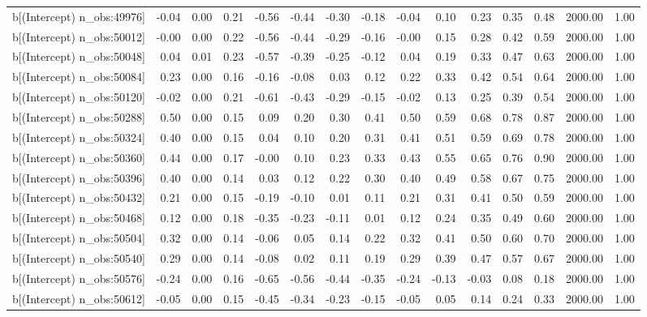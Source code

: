\begin{table}[ht]
\begin{tabular}{rrrrrrrrrrrrrrr}
  b[(Intercept) n\_obs:49976] & -0.04 & 0.00 & 0.21 & -0.56 & -0.44 & -0.30 & -0.18 & -0.04 & 0.10 & 0.23 & 0.35 & 0.48 & 2000.00 & 1.00 \\ 
  b[(Intercept) n\_obs:50012] & -0.00 & 0.00 & 0.22 & -0.56 & -0.44 & -0.29 & -0.16 & -0.00 & 0.15 & 0.28 & 0.42 & 0.59 & 2000.00 & 1.00 \\ 
  b[(Intercept) n\_obs:50048] & 0.04 & 0.01 & 0.23 & -0.57 & -0.39 & -0.25 & -0.12 & 0.04 & 0.19 & 0.33 & 0.47 & 0.63 & 2000.00 & 1.00 \\ 
  b[(Intercept) n\_obs:50084] & 0.23 & 0.00 & 0.16 & -0.16 & -0.08 & 0.03 & 0.12 & 0.22 & 0.33 & 0.42 & 0.54 & 0.64 & 2000.00 & 1.00 \\ 
  b[(Intercept) n\_obs:50120] & -0.02 & 0.00 & 0.21 & -0.61 & -0.43 & -0.29 & -0.15 & -0.02 & 0.13 & 0.25 & 0.39 & 0.54 & 2000.00 & 1.00 \\ 
  b[(Intercept) n\_obs:50288] & 0.50 & 0.00 & 0.15 & 0.09 & 0.20 & 0.30 & 0.41 & 0.50 & 0.59 & 0.68 & 0.78 & 0.87 & 2000.00 & 1.00 \\ 
  b[(Intercept) n\_obs:50324] & 0.40 & 0.00 & 0.15 & 0.04 & 0.10 & 0.20 & 0.31 & 0.41 & 0.51 & 0.59 & 0.69 & 0.78 & 2000.00 & 1.00 \\ 
  b[(Intercept) n\_obs:50360] & 0.44 & 0.00 & 0.17 & -0.00 & 0.10 & 0.23 & 0.33 & 0.43 & 0.55 & 0.65 & 0.76 & 0.90 & 2000.00 & 1.00 \\ 
  b[(Intercept) n\_obs:50396] & 0.40 & 0.00 & 0.14 & 0.03 & 0.12 & 0.22 & 0.30 & 0.40 & 0.49 & 0.58 & 0.67 & 0.75 & 2000.00 & 1.00 \\ 
  b[(Intercept) n\_obs:50432] & 0.21 & 0.00 & 0.15 & -0.19 & -0.10 & 0.01 & 0.11 & 0.21 & 0.31 & 0.41 & 0.50 & 0.59 & 2000.00 & 1.00 \\ 
  b[(Intercept) n\_obs:50468] & 0.12 & 0.00 & 0.18 & -0.35 & -0.23 & -0.11 & 0.01 & 0.12 & 0.24 & 0.35 & 0.49 & 0.60 & 2000.00 & 1.00 \\ 
  b[(Intercept) n\_obs:50504] & 0.32 & 0.00 & 0.14 & -0.06 & 0.05 & 0.14 & 0.22 & 0.32 & 0.41 & 0.50 & 0.60 & 0.70 & 2000.00 & 1.00 \\ 
  b[(Intercept) n\_obs:50540] & 0.29 & 0.00 & 0.14 & -0.08 & 0.02 & 0.11 & 0.19 & 0.29 & 0.39 & 0.47 & 0.57 & 0.67 & 2000.00 & 1.00 \\ 
  b[(Intercept) n\_obs:50576] & -0.24 & 0.00 & 0.16 & -0.65 & -0.56 & -0.44 & -0.35 & -0.24 & -0.13 & -0.03 & 0.08 & 0.18 & 2000.00 & 1.00 \\ 
  b[(Intercept) n\_obs:50612] & -0.05 & 0.00 & 0.15 & -0.45 & -0.34 & -0.23 & -0.15 & -0.05 & 0.05 & 0.14 & 0.24 & 0.33 & 2000.00 & 1.00 \\ 

\end{tabular}
\end{table}
